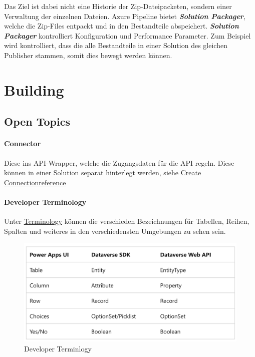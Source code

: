 Das Ziel ist dabei nicht eine Historie der Zip-Dateipacketen, sondern einer Verwaltung der einzelnen Dateien. Azure Pipeline bietet \textit{\textbf{Solution Packager}}, welche die Zip-Files entpackt und in den Bestandteile abspeichert. \textit{\textbf{Solution Packager}} kontrolliert Konfiguration und Performance Parameter. Zum Beispiel wird kontrolliert, dass die alle Bestandteile in einer Solution des gleichen Publisher stammen, somit dies bewegt werden können.



\section{Building}
\subsection{Open Topics}
\paragraph{Connector}
Diese ins API-Wrapper, welche die Zugangsdaten für die \gls{API} regeln. Diese können in einer Solution separat hinterlegt werden, siehe \href{https://docs.microsoft.com/en-us/power-apps/maker/data-platform/create-connection-reference}{Create Connectionreference}  

\paragraph{Developer Terminology} 
Unter 
\href{https://docs.microsoft.com/en-us/powerapps/developer/data-platform/understand-terminology}{Terminology}
 können die verschieden Bezeichnungen für Tabellen, Reihen, Spalten und weiteres in den verschiedensten Umgebungen zu sehen sein.
 \begin{figure}[H]
	\centering
	\includegraphics[scale = 0.3]{attachment/chapter_13/Scc052}
	\caption{Developer Terminlogy} 
\end{figure}

